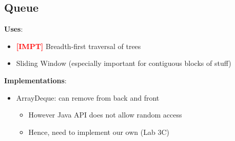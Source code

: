 \documentclass{article}
\newcommand{\impt}[0]{\textcolor{red}{\textbf{[IMPT] }}}
\begin{document}
\begin{multicols}{2}
\subsection{Queue}

\textbf{Uses}:
\begin{itemize}
	\item \impt Breadth-first traversal of trees
	\item Sliding Window (especially important for contiguous blocks of stuff)
\end{itemize}
\textbf{Implementations}:
\begin{itemize}
	\item ArrayDeque: can remove from back and front
	\begin{itemize}
		\item However Java API does not allow random access
		\item Hence, need to implement our own (Lab 3C)
	\end{itemize}
\end{itemize}

\end{multicols}
\end{document}
